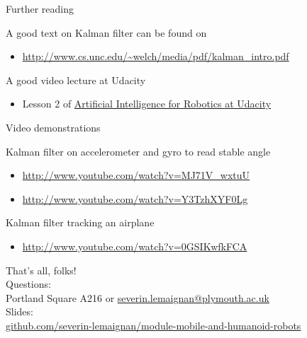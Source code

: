 \documentclass[compress]{beamer}
\begin{document}
\begin{frame}{Further reading}

A good text on Kalman filter can be found on

\begin{itemize}
    \item \url{http://www.cs.unc.edu/~welch/media/pdf/kalman_intro.pdf}
\end{itemize}

A good video lecture at Udacity

\begin{itemize}
    \item Lesson 2 of \href{https://www.udacity.com/course/cs373}{Artificial
  Intelligence for Robotics at Udacity}
\end{itemize}

Video demonstrations

Kalman filter on accelerometer and gyro to read stable angle

\begin{itemize}
    \item \url{http://www.youtube.com/watch?v=MJ71V_wxtuU}
    \item \url{http://www.youtube.com/watch?v=Y3TzhXYF0Lg}
\end{itemize}

Kalman filter tracking an airplane

\begin{itemize}
    \item \url{http://www.youtube.com/watch?v=0GSIKwfkFCA}
\end{itemize}

\end{frame}


\begin{frame}{}
    \begin{center}
        \Large
        That's all, folks!\\[2em]
        \normalsize
        Questions:\\
        Portland Square A216 or \url{severin.lemaignan@plymouth.ac.uk} \\[1em]

        Slides:\\ \href{https://github.com/severin-lemaignan/module-mobile-and-humanoid-robots}{\small github.com/severin-lemaignan/module-mobile-and-humanoid-robots}

    \end{center}
\end{frame}
\end{document}
